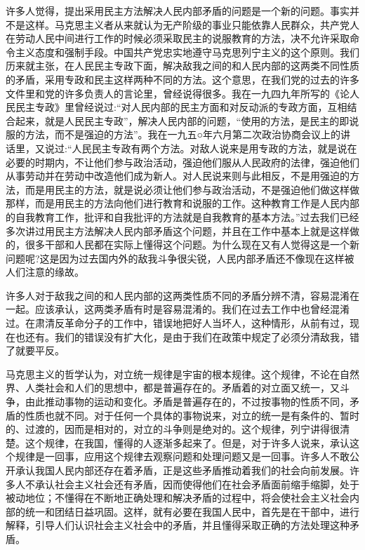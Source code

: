 \documentclass[UTF8, 12pt, a4paper]{ctexrep}
\begin{document}
许多人觉得，提出采用民主方法解决人民内部矛盾的问题是一个新的问题。事实并不是这样。马克思主义者从来就认为无产阶级的事业只能依靠人民群众，共产党人在劳动人民中间进行工作的时候必须采取民主的说服教育的方法，决不允许采取命令主义态度和强制手段。中国共产党忠实地遵守马克思列宁主义的这个原则。我们历来就主张，在人民民主专政下面，解决敌我之间的和人民内部的这两类不同性质的矛盾，采用专政和民主这样两种不同的方法。这个意思，在我们党的过去的许多文件里和党的许多负责人的言论里，曾经说得很多。我在一九四九年所写的《论人民民主专政》里曾经说过:“对人民内部的民主方面和对反动派的专政方面，互相结合起来，就是人民民主专政”，解决人民内部的问题，“使用的方法，是民主的即说服的方法，而不是强迫的方法”。我在一九五○年六月第二次政治协商会议上的讲话里，又说过:“人民民主专政有两个方法。对敌人说来是用专政的方法，就是说在必要的时期内，不让他们参与政治活动，强迫他们服从人民政府的法律，强迫他们从事劳动并在劳动中改造他们成为新人。对人民说来则与此相反，不是用强迫的方法，而是用民主的方法，就是说必须让他们参与政治活动，不是强迫他们做这样做那样，而是用民主的方法向他们进行教育和说服的工作。这种教育工作是人民内部的自我教育工作，批评和自我批评的方法就是自我教育的基本方法。”过去我们已经多次讲过用民主方法解决人民内部矛盾这个问题，并且在工作中基本上就是这样做的，很多干部和人民都在实际上懂得这个问题。为什么现在又有人觉得这是一个新问题呢?这是因为过去国内外的敌我斗争很尖锐，人民内部矛盾还不像现在这样被人们注意的缘故。

许多人对于敌我之间的和人民内部的这两类性质不同的矛盾分辨不清，容易混淆在一起。应该承认，这两类矛盾有时是容易混淆的。我们在过去工作中也曾经混淆过。在肃清反革命分子的工作中，错误地把好人当坏人，这种情形，从前有过，现在也还有。我们的错误没有扩大化，是由于我们在政策中规定了必须分清敌我，错了就要平反。

马克思主义的哲学认为，对立统一规律是宇宙的根本规律。这个规律，不论在自然界、人类社会和人们的思想中，都是普遍存在的。矛盾着的对立面又统一，又斗争，由此推动事物的运动和变化。矛盾是普遍存在的，不过按事物的性质不同，矛盾的性质也就不同。对于任何一个具体的事物说来，对立的统一是有条件的、暂时的、过渡的，因而是相对的，对立的斗争则是绝对的。这个规律，列宁讲得很清楚。这个规律，在我国，懂得的人逐渐多起来了。但是，对于许多人说来，承认这个规律是一回事，应用这个规律去观察问题和处理问题又是一回事。许多人不敢公开承认我国人民内部还存在着矛盾，正是这些矛盾推动着我们的社会向前发展。许多人不承认社会主义社会还有矛盾，因而使得他们在社会矛盾面前缩手缩脚，处于被动地位；不懂得在不断地正确处理和解决矛盾的过程中，将会使社会主义社会内部的统一和团结日益巩固。这样，就有必要在我国人民中，首先是在干部中，进行解释，引导人们认识社会主义社会中的矛盾，并且懂得采取正确的方法处理这种矛盾。
\end{document}
